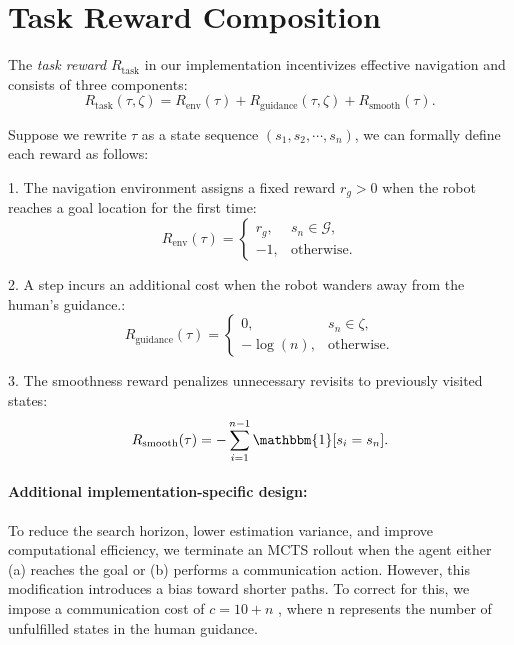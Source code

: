 \section{Task Reward Composition}\label{appendix:task_reward}
The \textit{task reward} $R_{\mathrm{task}}$ in our implementation incentivizes effective navigation and consists of three components:
\begin{equation}
    R_{\mathrm{task}}(\tau, \zeta) = R_{\mathrm{env}}(\tau) + R_{\mathrm{guidance}}(\tau, \zeta) + R_{\mathrm{smooth}}(\tau).
\end{equation}

Suppose we rewrite $\tau$ as a state sequence $(s_1, s_2, \cdots, s_n)$, we can formally define each reward as follows:

1. The navigation environment assigns a fixed reward $r_g > 0$ when the robot reaches a goal location for the first time:
   \begin{equation}
   R_{\mathrm{env}}(\tau) = \begin{cases} 
   r_g, & s_n \in \mathcal{G}, \\
   -1, & \text{otherwise.}
   \end{cases}
   \end{equation}

2. A step incurs an additional cost when the robot wanders away from the human's guidance.:
   \begin{equation}
   R_{\mathrm{guidance}}(\tau) = \begin{cases} 
   0, & s_n \in \zeta, \\
   -\log(n), & \text{otherwise.}
   \end{cases}
   \end{equation}

3. The smoothness reward penalizes unnecessary revisits to previously visited states:
   \begin{equation}
   R_{\mathrm{smooth}}(\tau) = -\sum_{i=1}^{n-1} \mathbbm{1}[s_i = s_n].
   \end{equation}

\paragraph{Additional implementation-specific design:} To reduce the search horizon, lower estimation variance, and improve computational efficiency, we terminate an MCTS rollout when the agent either (a) reaches the goal or (b) performs a communication action. However, this modification introduces a bias toward shorter paths. To correct for this, we impose a communication cost of  $c = 10 + n$ , where  n  represents the number of unfulfilled states in the human guidance.

